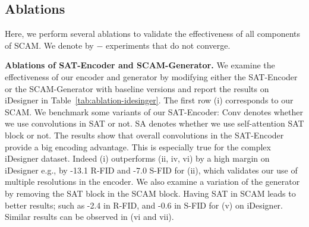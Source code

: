 \documentclass[runningheads]{llncs}
\makeatletter
\newcommand{\mname}{SCAM\@\xspace}
\makeatother
\begin{document}
\begin{comment}
\begin{table}[t]
\begin{center}
		\begin{small}
		\resizebox{\linewidth}{!}{
		\begin{tabular}{cccc|ccc}
\toprule
	
\multicolumn{2}{c}{\cellcolor{lavenderblue}{\textbf{Encoder}}} & \multicolumn{2}{c|}{\cellcolor{lavenderblue}{\textbf{Generator}}}  & \multicolumn{3}{c}{\cellcolor{lavenderblue}{\textbf{Metrics}}} \\
SEAN & SILA & SEAN & SCAM  & PSNR $\uparrow$ & R-FID $\downarrow$ & S-FID $\downarrow$\\
\midrule
$\surd$ & & $\surd$ & & 11.11 & 82.27 & 87.31 \\ $\surd$ & & & $\surd$ & 16.13 & 30.28 & 39.16 \\ & $\surd$ & & $\surd$ & \textbf{18.61} & \textbf{18.20} & \textbf{32.87}\\ 

\bottomrule
\end{tabular}
			}
		\end{small}
	\end{center}
	\caption{\small{Ablation study on LIP~\cite{Gong_2017_CVPR}.
	}}
\label{tab:ablation-lip-vic1}\\
\end{table}	
\end{comment} \subsection{Ablations}

Here, we perform several ablations to validate the effectiveness of all components of \mname. We denote by $-$ experiments that do not converge.

\noindent \textbf{Ablations of SAT-Encoder and SCAM-Generator.}
We examine the effectiveness of our encoder and generator by modifying either the SAT-Encoder or the SCAM-Generator with baseline versions and report the results on iDesigner in Table~\ref{tab:ablation-idesinger}. The first row (i) corresponds to our \mname. 
We benchmark some variants of our SAT-Encoder: Conv denotes whether we use convolutions in SAT or not. SA denotes whether we use self-attention SAT block or not.
The results show that overall convolutions in the SAT-Encoder provide a big encoding advantage. This is especially true for the complex iDesigner dataset. Indeed (i) outperforms (ii, iv, vi) by a high margin on iDesigner e.g., by -13.1 R-FID and -7.0 S-FID for (ii), which validates our use of multiple resolutions in the encoder.
We also examine a variation of the generator by removing the SAT block in the SCAM block.
Having SAT in SCAM leads to better results; such as -2.4 in R-FID, and -0.6 in S-FID for (v) on iDesigner. Similar results can be observed in (vi and vii).
\end{document}
